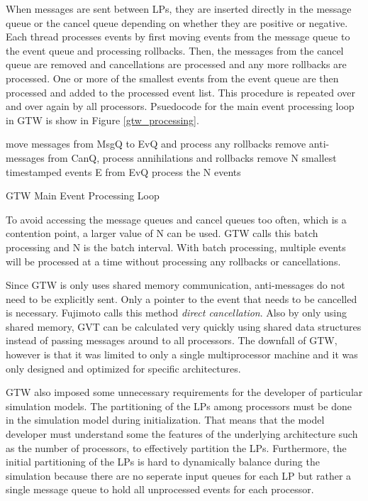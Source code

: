 \documentclass[11pt]{book}
\begin{document}
\noindent
When messages are sent between LPs, they are inserted directly in the message queue or the cancel
queue depending on whether they are positive or negative.  Each thread processes events by first
moving events from the message queue to the event queue and processing rollbacks.  Then, the
messages from the cancel queue are removed and cancellations are processed and any more rollbacks
are processed.  One or more of the smallest events from the event queue are then processed and added
to the processed event list.  This procedure is repeated over and over again by all processors.
Psuedocode for the main event processing loop in GTW is show in Figure \ref{gtw_processing}.

\begin{algorithm}
\DontPrintSemicolon
     {
        move messages from MsgQ to EvQ and process any rollbacks\;
        remove anti-messages from CanQ, process annihilations and rollbacks\;
        remove N smallest timestamped events E from EvQ\;
        process the N events\;
    }
\caption{GTW Main Event Processing Loop\cite{das-94,fujimoto-94}\label{gtw_processing}}
\end{algorithm}

\noindent
To avoid accessing the message queues and cancel queues too often, which is a contention point, a
larger value of N can be used.  GTW calls this batch processing and N is the batch interval.  With
batch processing, multiple events will be processed at a time without processing any rollbacks or
cancellations.

Since GTW is only uses shared memory communication, anti-messages do not need to be
explicitly sent.  Only a pointer to the event that needs to be cancelled is necessary.
Fujimoto calls this method \emph{direct cancellation}.  Also by only using shared memory,
GVT can be calculated very quickly using shared data structures instead of passing
messages around to all processors.  The downfall of GTW, however is that it was limited to
only a single multiprocessor machine and it was only designed and optimized for specific
architectures.

GTW also imposed some unnecessary requirements for the developer of particular simulation models.
The partitioning of the LPs among processors must be done in the simulation model during
initialization.  That means that the model developer must understand some the features of the
underlying architecture such as the number of processors, to effectively partition the LPs.
Furthermore, the initial partitioning of the LPs is hard to dynamically balance during the
simulation because there are no seperate input queues for each LP but rather a single message queue
to hold all unprocessed events for each processor.
\end{document}
